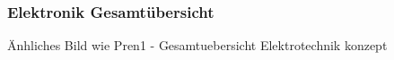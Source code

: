 \documentclass[main.tex]{subfiles} %
\begin{document}

\subsubsection{Elektronik Gesamtübersicht}

Änhliches Bild wie Pren1 - Gesamtuebersicht Elektrotechnik konzept
\end{document}

